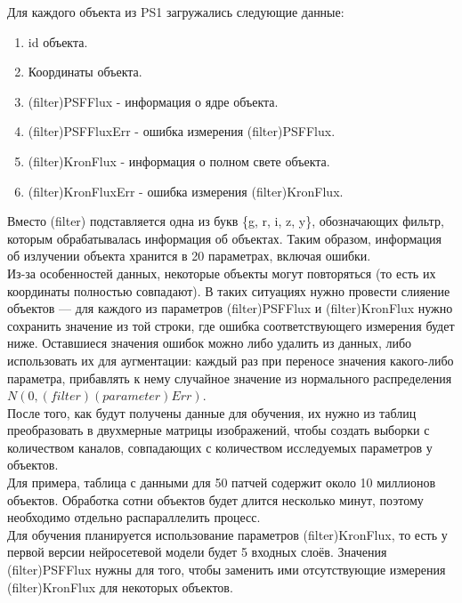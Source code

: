 Для каждого объекта из PS1 загружались следующие данные:
\begin{enumerate}
    \item id объекта.
    \item Координаты объекта.
    \item (filter)PSFFlux - информация о ядре объекта.
    \item (filter)PSFFluxErr - ошибка измерения (filter)PSFFlux.
    \item (filter)KronFlux - информация о полном свете объекта.
    \item (filter)KronFluxErr - ошибка измерения (filter)KronFlux.
\end{enumerate}

Вместо (filter) подставляется одна из букв \{g, r, i, z, y\}, обозначающих фильтр, которым 
обрабатывалась информация об объектах. Таким образом, информация об излучении объекта хранится в 
20 параметрах, включая ошибки.\\

Из-за особенностей данных, некоторые объекты могут повторяться (то есть их координаты полностью 
совпадают). В таких ситуациях нужно провести слияение объектов --- для каждого из параметров 
(filter)PSFFlux и (filter)KronFlux нужно сохранить значение из той строки, где ошибка 
соответствующего измерения будет ниже. Оставшиеся значения ошибок можно либо удалить из данных, 
либо использовать их для аугментации: 
каждый раз при переносе значения какого-либо параметра, прибавлять к нему случайное значение из 
нормального распределения $N(0, (filter)(parameter)Err)$.\\

После того, как будут получены данные для обучения, их нужно из таблиц преобразовать в двухмерные 
матрицы изображений, чтобы создать выборки с количеством каналов, совпадающих с количеством 
исследуемых параметров у объектов. \\

Для примера, таблица с данными для 50 патчей содержит около 10 миллионов объектов. Обработка 
сотни объектов будет длится несколько минут, поэтому необходимо отдельно распараллелить процесс.\\

Для обучения планируется использование параметров (filter)KronFlux, то есть у первой версии 
нейросетевой модели будет 5 входных слоёв. Значения (filter)PSFFlux нужны для того, чтобы заменить 
ими отсутствующие измерения (filter)KronFlux для некоторых объектов.\\

